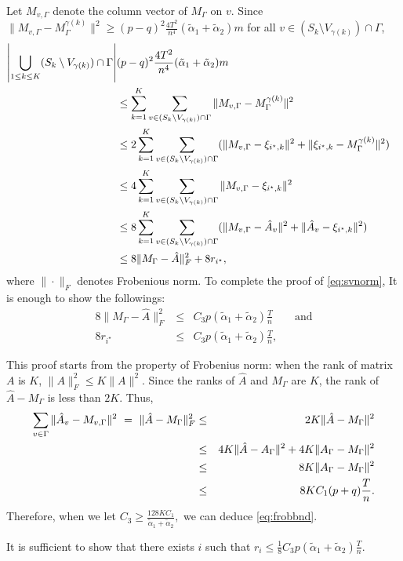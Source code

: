  Let $M_{v,\Gamma}$ denote
the column vector of $M_\Gamma$ on $v$. Since $\|M_{v,\Gamma}
-M_{\Gamma}^{\gamma(k)} \|^2 \ge (p-q)^2
\frac{4T^2}{n^4}(\tilde{\alpha}_1 + \tilde{\alpha}_2)m$ for all $v \in
(S_k \setminus V_{\gamma(k)})\cap \Gamma$,
\begin{align}
\left|\bigcup_{1\le k \le K}(S_k \setminus V_{\gamma(k)})\cap \Gamma\right| &
(p-q)^2 \frac{4T^2}{n^4}(\tilde{\alpha}_1 + \tilde{\alpha}_2)m \cr &\le \sum_{k=1}^K
\sum_{v \in (S_k \setminus V_{\gamma(k)})\cap \Gamma} \|M_{v,\Gamma} -
M_{\Gamma}^{\gamma(k)} \|^2 \cr
&\le 2\sum_{k=1}^K\sum_{v \in (S_k \setminus V_{\gamma(k)})\cap \Gamma}
(\|M_{v,\Gamma} -\xi_{i^\star ,k}\|^2+ \|\xi_{i^\star ,k}- M_{\Gamma}^{\gamma(k)} \|^2 )\cr
&\le 4\sum_{k=1}^K\sum_{v \in (S_k \setminus V_{\gamma(k)})\cap \Gamma}
\|M_{v,\Gamma} -\xi_{i^\star ,k}\|^2 \cr
&\le 8\sum_{k=1}^K\sum_{v \in (S_k \setminus V_{\gamma(k)})\cap \Gamma}
(\|M_{v,\Gamma} - \hat{A}_{v}\|^2+\|\hat{A}_{v}- \xi_{i^\star ,k}\|^2 )\cr
&\le 8 \|M_{\Gamma}-\hat{A} \|_F^2 + 8 r_{i^\star},\label{eq:svbound}
\end{align}
where $\| \cdot \|_{F}$ denotes Frobenious norm. To complete the proof
of \eqref{eq:svnorm}, It is enough to
show the followings:
\begin{eqnarray}
8 \|M_{\Gamma}-\hat{A} \|_F^2 & \le & C_3 p (\tilde{\alpha}_1 + \tilde{\alpha}_2) \frac{T}{n} \qquad\mbox{and} \label{eq:frobbnd} \\
8r_{i^\star} & \le & C_3 p(\tilde{\alpha}_1 + \tilde{\alpha}_2)\frac{T}{n}, \label{eq:rstarbnd}
\end{eqnarray}


 This proof starts from the
property of Frobenius norm: when the rank of matrix $A$ is $K$,
$\|A\|_F^2 \le K \|A\|^2$. Since the ranks of $\hat{A}$ and $M_{\Gamma}$
are $K$, the rank of $\hat{A} - M_{\Gamma}$ is less than $2K$. Thus,
\begin{eqnarray}
\sum_{v\in \Gamma}\|\hat{A}_{v} - M_{v,\Gamma} \|^2 ~ = ~
\|\hat{A} - M_{\Gamma} \|_F^2 & \le & 2K \|\hat{A} -
M_{\Gamma} \|^2 \cr
&\le & 4 K \|\hat{A} - A_{\Gamma}\|^2 +
4K\|A_{\Gamma}-M_{\Gamma} \|^2 \cr
&\le& 8K \| A_{\Gamma} - M_{\Gamma}\|^2 \cr
&\le & 8K C_1 (p+q)\frac{T}{n}. \label{eq:frobam}
\end{eqnarray}
Therefore, when we let $C_3 \ge \frac{128KC_1}{\tilde{\alpha}_1 + \tilde{\alpha}_2},$
we can deduce \eqref{eq:frobbnd}.

 It is sufficient to show
that there exists $i$ such that $r_i \le \frac{1}{8} C_3 p(\tilde{\alpha}_1 +
\tilde{\alpha}_2)\frac{T}{n} .$

